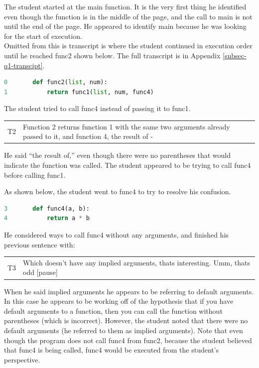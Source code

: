 The student started at the main function. It is the very first thing he identified even though the function is in the middle of the page, and the call to main is not until the end of the page.
He appeared to identify main because he was looking for the start of execution. \\

Omitted from this is transcript is where the student continued in execution order until he reached func2 shown below.
The full transcript is in Appendix \ref{subsec-q1-transcipt}.

\begin{lstlisting}[language=python]
0		def func2(list, num):
1			return func1(list, num, func4)
\end{lstlisting}

The student tried to call func4 instead of passing it to func1.

\begin{tabular}{lp{13cm}}
T2&Function 2 returns function 1 with the same two arguments already passed to it, and function 4, the result of -\\
\end{tabular}

He said ``the result of,'' even though there were no parentheses that would indicate the function was called.
The student appeared to be trying to call func4 before calling func1.

As shown below, the student went to func4 to try to resolve his confusion.

\begin{lstlisting}[language=python]
3		def func4(a, b):
4			return a * b
\end{lstlisting}

He considered ways to call func4 without any arguments, and finished his previous sentence with:

\begin{tabular}{lp{13cm}}
T3&Which doesn't have any implied arguments, thats interesting. Umm, thats odd [pause]\\
\end{tabular}

When he said implied arguments he appears to be referring to default arguments.
In this case he appears to be working off of the hypothesis that if you have default arguments to a function,
  then you can call the function without parentheses (which is incorrect).
However, the student noted that there were no default arguments (he referred to them as implied arguments).
Note that even though the program does not call func4 from func2, because the student believed that func4 is being called, func4 would be executed from the student's perspective. \\

